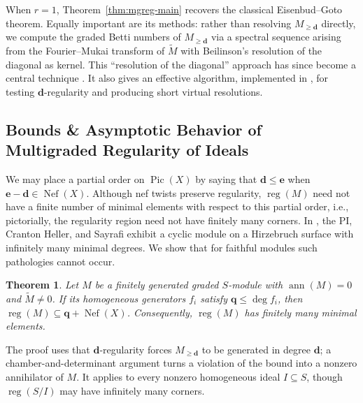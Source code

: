 \documentclass[11pt,reqno]{amsart}
\newtheorem{theorem}[lemma]{Theorem}
\theoremstyle{remark}
\newcommand{\reg}{\operatorname{reg}}
\newcommand{\ann}{\operatorname{ann}}
\newcommand{\Pic}{\operatorname{Pic}}
\newcommand{\Nef}{\operatorname{Nef}}
\newcommand{\dd}{\mathbf{d}}
\newcommand{\ee}{\mathbf{e}}
\newcommand{\qq}{\mathbf{q}}
\begin{document}
When $r=1$, Theorem~\ref{thm:mgreg-main} recovers the classical Eisenbud--Goto theorem. Equally important are its methods: rather than resolving $M_{\geq\dd}$ directly, we compute the graded Betti numbers of $M_{\geq\dd}$ via a spectral sequence arising from the Fourier--Mukai transform of $\widetilde{M}$ with Beilinson's resolution of the diagonal as kernel. This ``resolution of the diagonal'' approach has since become a central technique \cite{brownErmanTate,brownErman24-1,HHL24,brownSayrafi24}. It also gives an effective algorithm, implemented in \cite{ABLS20}, for testing $\dd$-regularity and producing short virtual resolutions.


\subsection{Bounds \& Asymptotic Behavior of Multigraded Regularity of Ideals}

We may place a partial order on $\Pic(X)$ by saying that $\dd\leq\ee$ when $\ee-\dd\in \Nef(X)$. Although nef twists preserve regularity, $\reg(M)$ need not have a finite number of minimal elements with respect to this partial order, i.e., pictorially, the regularity region need not have finitely many corners. In \cite[Example~1.1]{bruceHellerSayrafi22}, the PI, Cranton Heller, and Sayrafi exhibit a cyclic module on a Hirzebruch surface with infinitely many minimal degrees. We show that for faithful modules such pathologies cannot occur. 

\begin{theorem}\cite[Corollary~4.6]{bruceHellerSayrafi22}
Let $M$ be a finitely generated graded $S$-module with $\ann(M)=0$ and $\widetilde M\neq0$. If its homogeneous generators $f_i$ satisfy $\qq\leq\deg f_i$, then $\reg(M)\subseteq\qq+\Nef(X)$. Consequently, $\reg(M)$ has finitely many minimal elements.
\end{theorem}
The proof uses that $\dd$-regularity forces $M_{\geq\dd}$ to be generated in degree $\dd$; a chamber-and-determinant argument turns a violation of the bound into a nonzero annihilator of $M$. It applies to every nonzero homogeneous ideal $I\subseteq S$, though $\reg(S/I)$ may have infinitely many corners.
\end{document}
